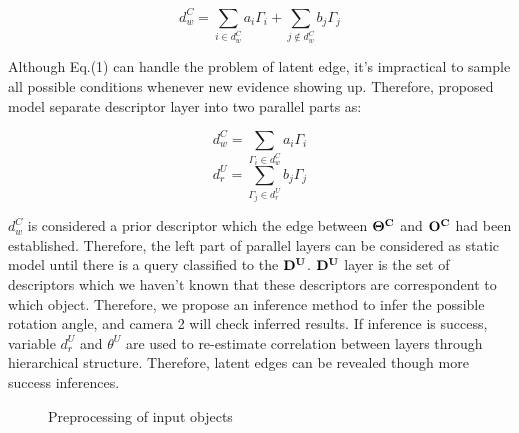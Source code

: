 \documentclass[journal]{IEEEtran}
\begin{document}
\begin{equation}
d^C_w=\sum_{i\in{d^C_w}}a_{i}\Gamma_{i}+\sum_{j\notin{d^C_w}}b_{j}\Gamma_{j}
\end{equation}

Although Eq.(1) can handle the problem of latent edge, it's impractical to sample all possible conditions whenever new evidence showing up. Therefore, proposed model separate descriptor layer into two parallel parts as: 

\begin{equation}
d^C_w=\sum_{\Gamma_{i}\in{d^C_w}}a_{i}\Gamma_{i}
\end{equation}
\begin{equation}
d^U_r=\sum_{\Gamma_{j}\in{d^U_r}}b_{j}\Gamma_{j}
\end{equation}

$d^C_w$ is considered a prior descriptor which the edge between $\bf{\Theta^{C}}$ and $\bf{O^C}$ had been established. Therefore, the left part of parallel layers can be considered as static model until there is a query classified to the $\bf{D^U}$. $\bf{D^U}$ layer is the set of descriptors which we haven't known that these descriptors are correspondent to which object. Therefore, we propose an inference method to infer the possible rotation angle, and camera 2 will check inferred results. If inference is success, variable $d^U_r$ and $\theta^{U}$ are used to re-estimate correlation between layers through hierarchical structure. Therefore, latent edges can be revealed though more success inferences.

\begin{figure}[!t]
\begin{center}
\caption{Preprocessing of input objects}\label{test}
\end{center}
\end{figure}
\end{document}
